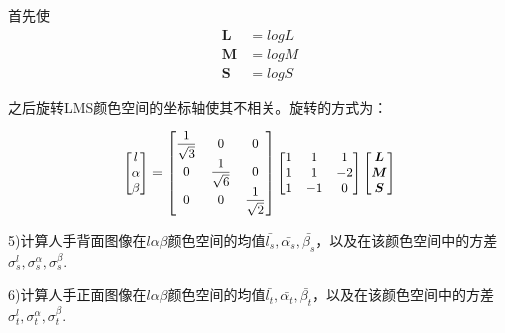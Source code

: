 首先使
\begin{equation}
 \begin{split}
\boldsymbol{L} &= logL \\
\boldsymbol{M} &= logM \\
\boldsymbol{S} &= logS
 \end{split}
\end{equation}

之后旋转LMS颜色空间的坐标轴使其不相关。旋转的方式为：

\begin{eqnarray}       %
\begin{small}
\begin{bmatrix}
    l\\  %
    \alpha\\  %
    \beta\\  %
\end{bmatrix}  
= 
\begin{bmatrix}
    \displaystyle\frac{1}{\sqrt{3}} & 0 & 0\\
    0 & \displaystyle\frac{1}{\sqrt{6}} & 0\\
    0 & 0 & \displaystyle\frac{1}{\sqrt{2}}\\
\end{bmatrix} 
\begin{bmatrix}
    1 & 1 & 1\\
    1 & 1 & -2\\
    1 & -1 & 0\\
\end{bmatrix} 
\begin{bmatrix}
	\boldsymbol{L}\\
	\boldsymbol{M}\\
	\boldsymbol{S}\\
\end{bmatrix}
\end{small}
\end{eqnarray}

5)计算人手背面图像在$l\alpha\beta$颜色空间的均值$\bar{l_{s}},\bar{\alpha_{s}},\bar{\beta_{s}}$，以及在该颜色空间中的方差$\sigma^{l}_{s},\sigma^{\alpha}_{s},\sigma^{\beta}_{s}$.

6)计算人手正面图像在$l\alpha\beta$颜色空间的均值$\bar{l_{t}},\bar{\alpha_{t}},\bar{\beta_{t}}$，以及在该颜色空间中的方差$\sigma^{l}_{t},\sigma^{\alpha}_{t},\sigma^{\beta}_{t}$.

